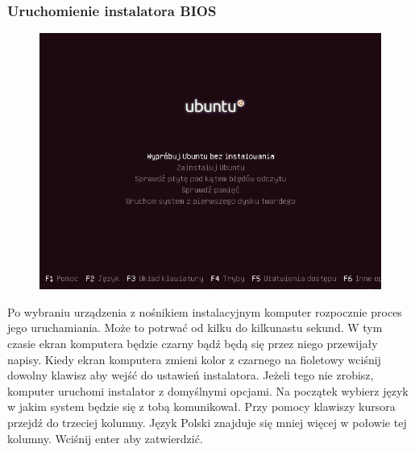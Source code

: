\subsubsection{Uruchomienie instalatora BIOS}
\label{instalacja_uruchomienie}
\begin{figure}
                \includegraphics[scale=0.5]{images/instalacja_BIOS_boot.png}
\end{figure}
Po wybraniu urządzenia z nośnikiem instalacyjnym komputer rozpocznie proces jego uruchamiania. Może to potrwać od kilku do kilkunastu sekund. W tym czasie ekran komputera będzie czarny bądź będą się przez niego przewijały napisy. Kiedy ekran komputera zmieni kolor z czarnego na fioletowy wciśnij dowolny klawisz aby wejść do ustawień instalatora. Jeżeli tego nie zrobisz, komputer uruchomi instalator z domyślnymi opcjami. Na początek wybierz język w jakim system będzie się z tobą komunikował. Przy pomocy klawiszy kursora przejdź do trzeciej kolumny. Język Polski  znajduje się mniej więcej w połowie tej kolumny. Wciśnij enter aby zatwierdzić.
\clearpage
